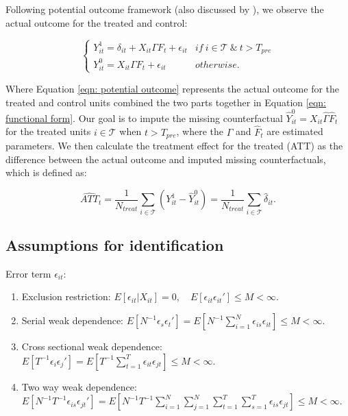 \documentclass[12pt]{article}
\begin{document}
Following \cite{splawa1990application} potential outcome framework (also discussed by \cite{rubin1974estimating, rubin2005causal}), we observe the actual outcome for the treated and control:

\begin{equation}
\label{eqn: potential outcome}
\begin{cases}
      Y_{it}^1 = \delta_{it} + X_{it} \Gamma F_t + \epsilon_{it} & if \ i \in \mathcal{T} \ \& \ t > T_{pre} \\
      Y_{it}^0 = X_{it} \Gamma F_t + \epsilon_{it} & otherwise.
\end{cases}
\end{equation}

\noindent Where Equation \ref{eqn: potential outcome} represents the actual outcome for the treated and control units combined the two parts together in Equation \ref{eqn: functional form}. Our goal is to impute the missing counterfactual $\hat{Y}_{it}^0 = X_{it} \hat{\Gamma} \hat{F}_t$ for the treated units $i \in \mathcal{T}$ when $t > T_{pre}$, where the $\hat{\Gamma}$ and $\hat{F}_t$ are estimated parameters. We then calculate the treatment effect for the treated (ATT) as the difference between the actual outcome and imputed missing counterfactuals, which is defined as:

\begin{equation}
\widehat{ATT}_{t} = \frac{1}{N_{treat}}\sum_{i \in \mathcal{T}} \left( Y_{it}^1 - \hat{Y}_{it}^0 \right) = \frac{1}{N_{treat}}\sum_{i \in \mathcal{T}}\hat{\delta}_{it}.
\end{equation}
\subsection{Assumptions for identification}

\begin{assumption}
Error term $\epsilon_{it}$: 

\begin{enumerate}
    \item Exclusion restriction: $E[\epsilon_{it} | X_{it}] = 0, \quad E[\epsilon_{it} \epsilon_{it}'] \leq M <\infty.$
    
    \item Serial weak dependence: $E \left[N^{-1}\epsilon_s \epsilon_t' \right] = E \left[N^{-1}\sum_{i=1}^{N}\epsilon_{is}\epsilon_{it} \right] \leq M < \infty.$
    
    \item Cross sectional weak dependence: $E \left[T^{-1}\epsilon_i \epsilon_j' \right] = E \left[T^{-1}\sum_{t=1}^{T}\epsilon_{it}\epsilon_{jt} \right] \leq M < \infty.$
    
    \item Two way weak dependence: $E \left[N^{-1}T^{-1}\epsilon_{is} \epsilon_{jt}' \right] = E \left[N^{-1}T^{-1}\sum_{i=1}^{N}\sum_{j=1}^{N}\sum_{t=1}^{T}\sum_{s=1}^{T}\epsilon_{is}\epsilon_{jt} \right] \leq M < \infty.$
\end{enumerate}
\label{ass: error} 
\end{assumption}
\end{document}

